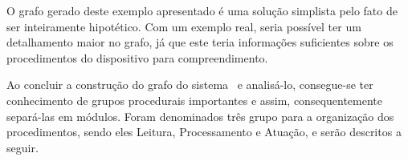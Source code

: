          O grafo gerado deste exemplo apresentado é uma solução simplista pelo fato de ser inteiramente hipotético.
         Com um exemplo real, seria possível ter um detalhamento maior no grafo, já que este teria informações suficientes sobre os procedimentos do dispositivo para compreendimento.

         Ao concluir a construção do grafo do sistema \wearable\ e analisá-lo, consegue-se ter conhecimento de grupos procedurais importantes e assim, consequentemente separá-las em módulos.
         Foram denominados três grupo para a organização dos procedimentos, sendo eles Leitura, Processamento e Atuação, e serão descritos a seguir.

